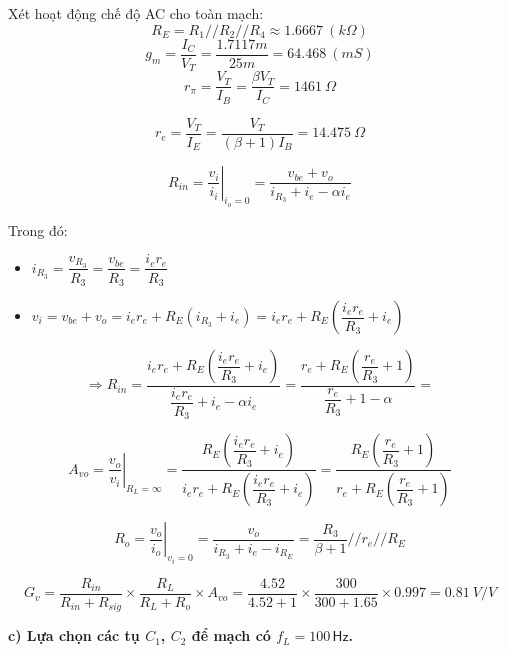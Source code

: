 Xét hoạt động chế độ AC cho toàn mạch:
\begin{equation*}
	R_E = R_1//R_2//R_4 \approx 1.6667\ (k\Omega)
\end{equation*}
\begin{equation*}
	g_m = \dfrac{I_C}{V_T} = \dfrac{1.7117m}{25m} = 64.468\ (mS)
\end{equation*}
\[
r_\pi = \frac{V_T}{I_B} = \frac{\beta V_T}{I_C} = 1461\ \Omega
\]

\[
r_e = \frac{V_T}{I_E} = \frac{V_T}{(\beta+1)I_B} = 14.475\ \Omega
\]

\[
R_{in} = \left. \frac{v_i}{i_i} \right|_{i_o=0} = \dfrac{v_{be} + v_o}{i_{R_3}+i_e-\alpha i_e}
\]

Trong đó:
\begin{itemize}
	\item[+] $i_{R_3} = \dfrac{v_{R_3}}{R_3}=\dfrac{v_{be}}{R_3}=\dfrac{i_e r_e}{R_3}$
	\item[+] $v_i = v_{be} + v_o = i_e r_e + R_E(i_{R_3}+i_e)=i_e r_e + R_E\left(\dfrac{i_e r_e}{R_3}+i_e\right)$
\end{itemize}

\begin{equation*}
	\Rightarrow R_{in} = \dfrac{i_e r_e + R_E\left(\dfrac{i_e r_e}{R_3}+i_e\right)}{\dfrac{i_e r_e}{R_3}+i_e-\alpha i_e} = \dfrac{r_e +  R_E\left(\dfrac{r_e}{R_3}+1\right)}{\dfrac{r_e}{R_3}+1-\alpha} = 
\end{equation*}

\[
A_{vo} = \left. \frac{v_o}{v_i} \right|_{R_L=\infty} = \dfrac{R_E\left(\dfrac{i_e r_e}{R_3}+i_e\right)}{i_e r_e + R_E\left(\dfrac{i_e r_e}{R_3}+i_e\right)} = \dfrac{R_E\left(\dfrac{r_e}{R_3}+1\right)}{r_e + R_E\left(\dfrac{r_e}{R_3}+1\right)}
\]

\[
R_o = \left. \frac{v_o}{i_o} \right|_{v_i=0}= \dfrac{v_o}{i_{R_3}+i_e-i_{R_E}} = \dfrac{R_3}{\beta+1}//r_e//R_E
\]

\[
G_v = \frac{R_{in}}{R_{in} + R_{sig}} \times 
\frac{R_L}{R_L + R_o} \times A_{vo} 
= \frac{4.52}{4.52 + 1} \times 
\frac{300}{300 + 1.65} \times 0.997 
= 0.81\ V/V
\]



\textbf{c) Lựa chọn các tụ $C_{1}$, $C_{2}$ để mạch có $f_{L}=100\,\textsf{Hz}$.}